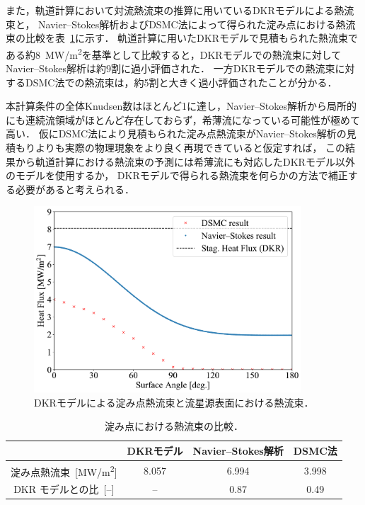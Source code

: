また，軌道計算において対流熱流束の推算に用いているDKRモデルによる熱流束と，
Navier–Stokes解析およびDSMC法によって得られた淀み点における熱流束の比較を表~\ref{tab:heat-flux}に示す．
軌道計算に用いたDKRモデルで見積もられた熱流束である約\SI{8}{MW/m^2}を基準として比較すると，DKRモデルでの熱流束に対してNavier–Stokes解析は約9割に過小評価された．
一方DKRモデルでの熱流束に対するDSMC法での熱流束は，約5割と大きく過小評価されたことが分かる．

本計算条件の全体Knudsen数はほとんど1に達し，Navier–Stokes解析から局所的にも連続流領域がほとんど存在しておらず，希薄流になっている可能性が極めて高い．
仮にDSMC法により見積もられた淀み点熱流束がNavier–Stokes解析の見積もりよりも実際の物理現象をより良く再現できていると仮定すれば，
この結果から軌道計算における熱流束の予測には希薄流にも対応したDKRモデル以外のモデルを使用するか，
DKRモデルで得られる熱流束を何らかの方法で補正する必要があると考えられる．

\begin{figure}[H]
    \centering
    \includegraphics[width=10cm]{fig/min_knud/heat-flux-magni.pdf}
    \caption{DKRモデルによる淀み点熱流束と流星源表面における熱流束．}
    \label{fig:min-knud-heat-flux}
\end{figure}

\begin{table}[H]
    \centering
    \caption{淀み点における熱流束の比較．}
    \begin{tabular}{c|ccc}
        \hline\hline
         & DKRモデル & Navier–Stokes解析 & DSMC法 \\ \hline
        淀み点熱流束~[\si{MW/m^2}] & 8.057 & 6.994 & 3.998 \\
        DKR モデルとの比~[–] & – & 0.87 & 0.49 \\
        \hline\hline
    \end{tabular}
    \label{tab:heat-flux}
\end{table}

